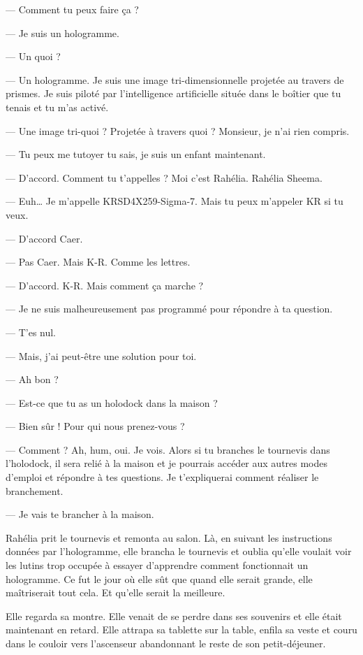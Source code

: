 \documentclass[ebook,12pt,oneside,onecolumn,openright,draft]{memoir}
\begin{document}
  — Comment tu peux faire ça ?

  — Je suis un hologramme.

  — Un quoi ?

— Un hologramme. Je suis une image tri-dimensionnelle projetée au travers de
prismes. Je suis piloté par l'intelligence artificielle située dans le boîtier
que tu tenais et tu m'as activé.

— Une image tri-quoi ? Projetée à travers quoi ? Monsieur, je n'ai rien compris.

— Tu peux me tutoyer tu sais, je suis un enfant maintenant.

  — D'accord. Comment tu t'appelles ? Moi c'est Rahélia. Rahélia Sheema.

  — Euh… Je m'appelle KRSD4X259-Sigma-7. Mais tu peux m'appeler KR si tu veux.

  — D’accord Caer.

  — Pas Caer. Mais K-R. Comme les lettres.

  — D'accord. K-R. Mais comment ça marche ?

  — Je ne suis malheureusement pas programmé pour répondre à ta question.

  — T'es nul.

  — Mais, j'ai peut-être une solution pour toi.

  — Ah bon ?

  — Est-ce que tu as un holodock dans la maison ?

  — Bien sûr ! Pour qui nous prenez-vous ?

— Comment ? Ah, hum, oui. Je vois. Alors si tu branches le tournevis dans
l'holodock, il sera relié à la maison et je pourrais accéder aux autres modes
d'emploi et répondre à tes questions. Je t'expliquerai comment réaliser le
branchement.

  — Je vais te brancher à la maison.

Rahélia prit le tournevis et remonta au salon. Là, en suivant les instructions
données par l'hologramme, elle brancha le tournevis et oublia qu'elle voulait
voir les lutins trop occupée à essayer d'apprendre comment fonctionnait un
hologramme. Ce fut le jour où elle sût que quand elle serait grande, elle
maîtriserait tout cela. Et qu'elle serait la meilleure.

Elle regarda sa montre. Elle venait de se perdre dans ses souvenirs et elle
était maintenant en retard. Elle attrapa sa tablette sur la table, enfila sa
veste et couru dans le couloir vers l’ascenseur abandonnant le reste de son
petit-déjeuner.
\end{document}
